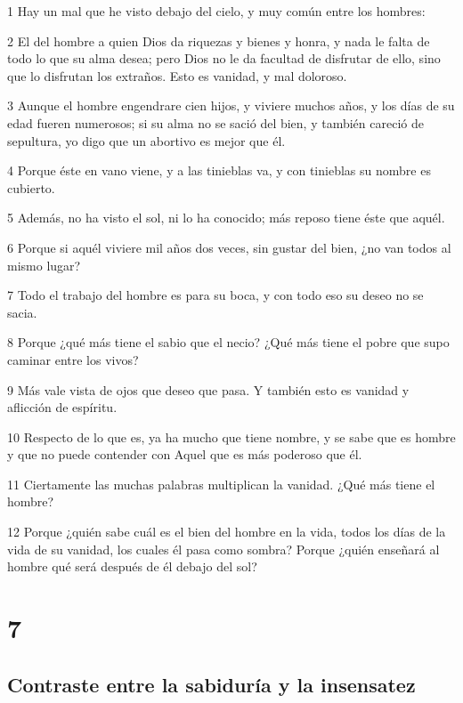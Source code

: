 \par 1 Hay un mal que he visto debajo del cielo, y muy común entre los hombres:
\par 2 El del hombre a quien Dios da riquezas y bienes y honra, y nada le falta de todo lo que su alma desea; pero Dios no le da facultad de disfrutar de ello, sino que lo disfrutan los extraños. Esto es vanidad, y mal doloroso.
\par 3 Aunque el hombre engendrare cien hijos, y viviere muchos años, y los días de su edad fueren numerosos; si su alma no se sació del bien, y también careció de sepultura, yo digo que un abortivo es mejor que él.
\par 4 Porque éste en vano viene, y a las tinieblas va, y con tinieblas su nombre es cubierto.
\par 5 Además, no ha visto el sol, ni lo ha conocido; más reposo tiene éste que aquél.
\par 6 Porque si aquél viviere mil años dos veces, sin gustar del bien, ¿no van todos al mismo lugar?
\par 7 Todo el trabajo del hombre es para su boca, y con todo eso su deseo no se sacia.
\par 8 Porque ¿qué más tiene el sabio que el necio? ¿Qué más tiene el pobre que supo caminar entre los vivos?
\par 9 Más vale vista de ojos que deseo que pasa. Y también esto es vanidad y aflicción de espíritu.
\par 10 Respecto de lo que es, ya ha mucho que tiene nombre, y se sabe que es hombre y que no puede contender con Aquel que es más poderoso que él.
\par 11 Ciertamente las muchas palabras multiplican la vanidad. ¿Qué más tiene el hombre?
\par 12 Porque ¿quién sabe cuál es el bien del hombre en la vida, todos los días de la vida de su vanidad, los cuales él pasa como sombra? Porque ¿quién enseñará al hombre qué será después de él debajo del sol?

\chapter{7}

\section*{Contraste entre la sabiduría y la insensatez}

